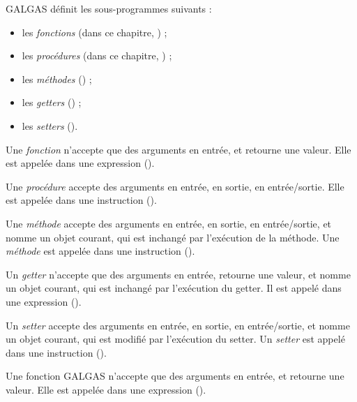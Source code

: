 

GALGAS définit les sous-programmes suivants :
\begin{itemize}
  \item les \emph{fonctions} (dans ce chapitre, ) ;
  \item les \emph{procédures} (dans ce chapitre, ) ;
  \item les \emph{méthodes} () ;
  \item les \emph{getters} () ;
  \item les \emph{setters} ().
\end{itemize}

Une \emph{fonction} n'accepte que des arguments en entrée, et retourne une valeur. Elle est appelée dans une expression ().

Une \emph{procédure} accepte des arguments en entrée, en sortie, en entrée/sortie. Elle est appelée dans une instruction ().

Une \emph{méthode} accepte des arguments en entrée, en sortie, en entrée/sortie, et nomme un objet courant, qui est inchangé par l'exécution de la méthode. Une \emph{méthode} est appelée dans une instruction ().

Un \emph{getter} n'accepte que des arguments en entrée, retourne une valeur, et nomme un objet courant, qui est inchangé par l'exécution du getter. Il est appelé dans une expression ().

Un \emph{setter} accepte des arguments en entrée, en sortie, en entrée/sortie, et nomme un objet courant, qui est modifié par l'exécution du setter. Un \emph{setter} est appelé dans une instruction ().







Une fonction GALGAS n'accepte que des arguments en entrée, et retourne une valeur. Elle est appelée dans une expression ().

